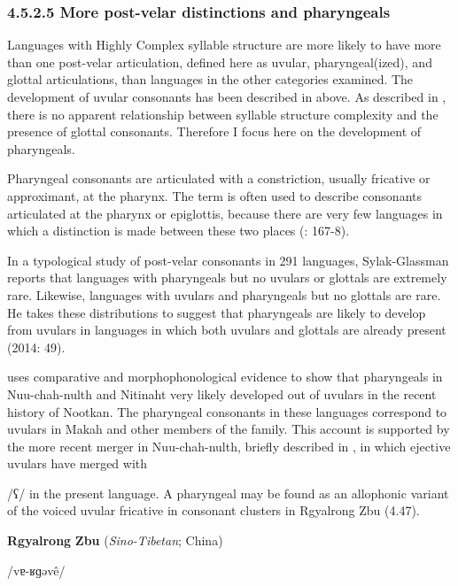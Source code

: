 \subsubsection{\textbf{4.5.2.5} \textbf{More} \textbf{post-velar} \textbf{distinctions} \textbf{and} \textbf{pharyngeals}}

  Languages with Highly Complex syllable structure are more likely to have more than one post-velar articulation, defined here as uvular, pharyngeal(ized), and glottal articulations, than languages in the other categories examined. The development of uvular consonants has been described in  above. As described in , there is no apparent relationship between syllable structure complexity and the presence of glottal consonants. Therefore I focus here on the development of pharyngeals.

  Pharyngeal consonants are articulated with a constriction, usually fricative or approximant, at the pharynx. The term is often used to describe consonants articulated at the pharynx or epiglottis, because there are very few languages in which a distinction is made between these two places (\citealt{LadefogedMaddieson1996}: 167-8).

  In a typological study of post-velar consonants in 291 languages, Sylak-Glassman reports that languages with pharyngeals but no uvulars or glottals are extremely rare. Likewise, languages with uvulars and pharyngeals but no glottals are rare. He takes these distributions to suggest that pharyngeals are likely to develop from uvulars in languages in which both uvulars and glottals are already present (2014: 49).

  \citet{Jacobsen1969} uses comparative and morphophonological evidence to show that pharyngeals in Nuu-chah-nulth and Nitinaht very likely developed out of uvulars in the recent history of Nootkan. The pharyngeal consonants in these languages correspond to uvulars in Makah and other members of the family. This account is supported by the more recent merger in Nuu-chah-nulth, briefly described in , in which ejective uvulars have merged with 

/ʕ/ in the present language. A pharyngeal may be found as an allophonic variant of the voiced uvular fricative in consonant clusters in Rgyalrong Zbu (4.47).

\ea\label{ex:(4.47)}
  \textbf{Rgyalrong} \textbf{Zbu} (\textit{Sino-Tibetan}; China)

/vɐ{}-ʁɡəvê/

